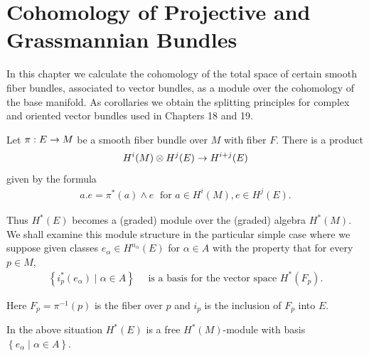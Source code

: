 \chapter[Cohomology of Projective and Grassmannian Bundles]{Cohomology of Projective and\\ Grassmannian Bundles}
In this chapter we calculate the cohomology of the total space of certain smooth fiber bundles, 
associated to vector bundles, as a module over the cohomology of the base manifold. 
As corollaries we obtain the splitting principles for complex and oriented vector 
bundles used in Chapters 18 and 19.

Let $\pi:E\rightarrow M$ be a smooth fiber bundle over $M$ with fiber $F$. There is a product
\[
  H^{i}( M)  \otimes  H^{j}( E)  \rightarrow  H^{i + j}( E)
\]
given by the formula
\begin{align}\label{eq:20-1}
  a.e = {\pi }^*( a)  \land  e\;\text{ for }a \in  H^{i}( M),e \in  H^{j}( E).
\end{align}

Thus $H^*( E)$ becomes a (graded) module over the (graded) algebra $H^*( M)$. We shall examine 
this module structure in the particular simple case where we suppose given classes ${e}_{\alpha } \in  H^{{n}_{\alpha }}( E)$ 
for $\alpha \in  A$ with the property that for every $p \in  M$,
\begin{align}\label{eq:20-2}
  \left\{  {{i}_{p}^*( {e}_{\alpha })  \mid  \alpha  \in  A}\right\}  
  \quad
  \text{ is a basis for the vector space }H^*( {F}_{p}).
\end{align}

Here ${F}_{p} = {\pi }^{-1}( p)$ is the fiber over $p$ and ${i}_{p}$ is the inclusion of ${F}_{p}$ into $E$.

\begin{theorem}\label{theorem:20-1}
  In the above situation $H^*( E)$ is a free $H^*( M)$-module with basis $\left\{  {{e}_{\alpha } \mid  \alpha  \in  A}\right\}$.  
\end{theorem}

